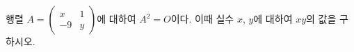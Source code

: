 행렬 $A=\begin{pmatrix} x & 1 \\ -9 & y \end{pmatrix}$에 대하여 $A^2=O$이다. 이때 실수 $x$, $y$에 대하여 $xy$의 값을 구하시오. 
